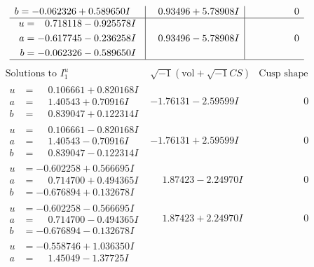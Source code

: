 \documentclass[1p]{elsarticle_modified}
\theoremstyle{definition}
\newcommand{\I}{\sqrt{-1}}
\begin{document}
$$\begin{array}{c|c|c}
\begin{aligned}
b &= -0.062326 + 0.589650 I\end{aligned}
 & \phantom{-}0.93496 + 5.78908 I & \phantom{-0.000000 } 0 \\ \hline\begin{aligned}
u &= \phantom{-}0.718118 - 0.925578 I \\
a &= -0.617745 - 0.236258 I \\
b &= -0.062326 - 0.589650 I\end{aligned}
 & \phantom{-}0.93496 - 5.78908 I & \phantom{-0.000000 } 0\\
 \hline 
 \end{array}$$\newpage$$\begin{array}{c|c|c}  
\text{Solutions to }I^u_{1}& \I (\text{vol} + \sqrt{-1}CS) & \text{Cusp shape}\\
 \hline 
\begin{aligned}
u &= \phantom{-}0.106661 + 0.820168 I \\
a &= \phantom{-}1.40543 + 0.70916 I \\
b &= \phantom{-}0.839047 + 0.122314 I\end{aligned}
 & -1.76131 - 2.59599 I & \phantom{-0.000000 } 0 \\ \hline\begin{aligned}
u &= \phantom{-}0.106661 - 0.820168 I \\
a &= \phantom{-}1.40543 - 0.70916 I \\
b &= \phantom{-}0.839047 - 0.122314 I\end{aligned}
 & -1.76131 + 2.59599 I & \phantom{-0.000000 } 0 \\ \hline\begin{aligned}
u &= -0.602258 + 0.566695 I \\
a &= \phantom{-}0.714700 + 0.494365 I \\
b &= -0.676894 + 0.132678 I\end{aligned}
 & \phantom{-}1.87423 - 2.24970 I & \phantom{-0.000000 } 0 \\ \hline\begin{aligned}
u &= -0.602258 - 0.566695 I \\
a &= \phantom{-}0.714700 - 0.494365 I \\
b &= -0.676894 - 0.132678 I\end{aligned}
 & \phantom{-}1.87423 + 2.24970 I & \phantom{-0.000000 } 0 \\ \hline\begin{aligned}
u &= -0.558746 + 1.036350 I \\
a &= \phantom{-}1.45049 - 1.37725 I \\

\end{aligned}
\end{array}$$
\end{document}
